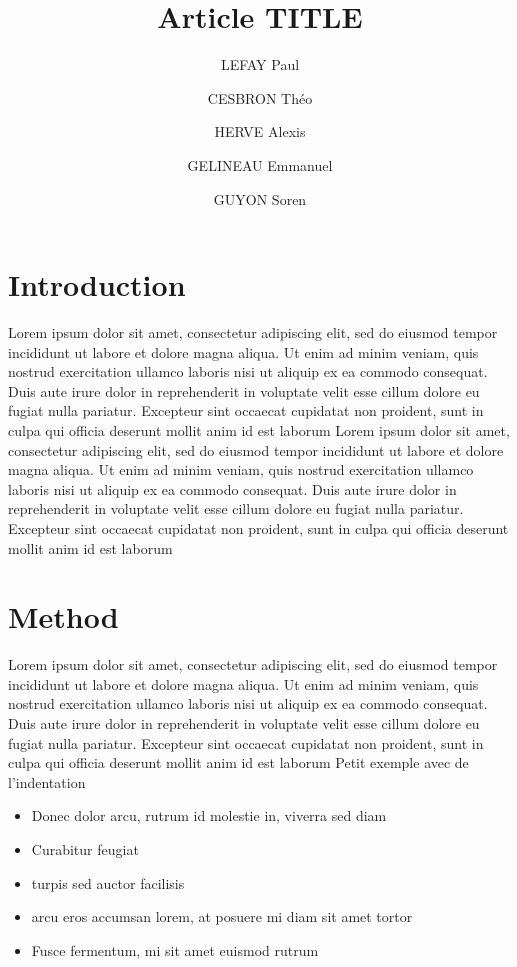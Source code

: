 \documentclass[twoside,twocolumn]{article}                          %
\title{Article TITLE}                                               %
\author[3]{LEFAY Paul}                                              %
\author[1]{CESBRON Théo}
\author[2]{HERVE Alexis}
\author[2]{GELINEAU Emmanuel}
\author[2]{GUYON Soren}
\affil[1]{DSMT}                                                     %
\affil[2]{EOC}
\affil[3]{CSS}
\begin{document}
\renewcommand\thesection{\Roman{section}}                           %
\renewcommand\thesubsection{\roman{subsection}}                     %


\cfoot{\thepage}

\maketitle{}										                                    %

\newpage
\section{Introduction}
Lorem ipsum dolor sit amet, consectetur adipiscing elit, sed do eiusmod tempor incididunt ut labore et dolore magna aliqua. Ut enim ad minim veniam, quis nostrud exercitation ullamco laboris nisi ut aliquip ex ea commodo consequat. Duis aute irure dolor in reprehenderit in voluptate velit esse cillum dolore eu fugiat nulla pariatur. Excepteur sint occaecat cupidatat non proident, sunt in culpa qui officia deserunt mollit anim id est laborum
Lorem ipsum dolor sit amet, consectetur adipiscing elit, sed do eiusmod tempor incididunt ut labore et dolore magna aliqua. Ut enim ad minim veniam, quis nostrud exercitation ullamco laboris nisi ut aliquip ex ea commodo consequat. Duis aute irure dolor in reprehenderit in voluptate velit esse cillum dolore eu fugiat nulla pariatur. Excepteur sint occaecat cupidatat non proident, sunt in culpa qui officia deserunt mollit anim id est laborum

\section{Method}
Lorem ipsum dolor sit amet, consectetur adipiscing elit, sed do eiusmod tempor incididunt ut labore et dolore magna aliqua. Ut enim ad minim veniam, quis nostrud exercitation ullamco laboris nisi ut aliquip ex ea commodo consequat. Duis aute irure dolor in reprehenderit in voluptate velit esse cillum dolore eu fugiat nulla pariatur. Excepteur sint occaecat cupidatat non proident, sunt in culpa qui officia deserunt mollit anim id est laborum
Petit exemple avec de l'indentation
\begin{itemize}
  \item Donec dolor arcu, rutrum id molestie in, viverra sed diam
  \item Curabitur feugiat
  \item turpis sed auctor facilisis
  \item arcu eros accumsan lorem, at posuere mi diam sit amet tortor
  \item Fusce fermentum, mi sit amet euismod rutrum
\end{itemize}
\end{document}
